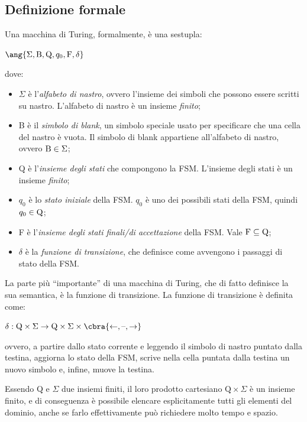 \subsection*{Definizione formale}
Una macchina di Turing, formalmente, è una sestupla:
\begin{center}
    $\ang{\Sigma, \textrm{B}, \textrm{Q}, q_0, \textrm{F}, \delta}$
\end{center}
dove:
\begin{itemize}
    \item $\Sigma$ è l'\textit{alfabeto di nastro}, ovvero l'insieme dei
    simboli che possono essere scritti su nastro. L'alfabeto di nastro è un
    insieme \textit{finito};
    \item B è il \textit{simbolo di blank}, un simbolo speciale usato per
    specificare che una cella del nastro è vuota. Il simbolo di blank
    appartiene all'alfabeto di nastro, ovvero $\textnormal{B} \in \Sigma$;
    \item Q è l'\textit{insieme degli stati} che compongono la FSM.
    L'insieme degli stati è un insieme \textit{finito};
    \item $q_0$ è lo \textit{stato iniziale} della FSM. $q_0$ è uno dei
    possibili stati della FSM, quindi $q_0 \in \textnormal{Q}$;
    \item F è l'\textit{insieme degli stati finali/di accettazione} della FSM.
    Vale $\textnormal{F} \subseteq \textnormal{Q}$;
    \item $\delta$ è la \textit{funzione di transizione}, che definisce come
    avvengono i passaggi di stato della FSM.
\end{itemize}

La parte più “importante” di una macchina di Turing, che di fatto definisce la
sua semantica, è la funzione di transizione.
La funzione di transizione è definita come:
\begin{center}
    $\delta: \textrm{Q} \times \Sigma \rightarrow
    \textrm{Q} \times \Sigma \times \cbra{ \leftarrow, \textrm{\textendash}, \rightarrow }$
\end{center}
ovvero, a partire dallo stato corrente e leggendo il simbolo di nastro puntato
dalla testina, aggiorna lo stato della FSM, scrive nella cella puntata dalla
testina un nuovo simbolo e, infine, muove la testina.

Essendo Q e $\Sigma$ due insiemi finiti, il loro prodotto cartesiano
$\textrm{Q} \times \Sigma$ è un insieme finito, e di conseguenza è possibile
elencare esplicitamente tutti gli elementi del dominio, anche se farlo
effettivamente può richiedere molto tempo e spazio.

